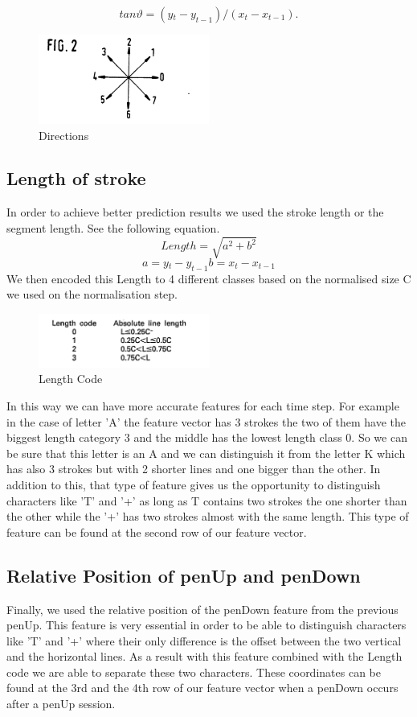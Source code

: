 \documentclass[a4paper, 10pt]{article}
\begin{document}
\[
tan \vartheta = (y{}_t - y_{t-1} )/(x{}_t - x_{t-1}) .
\]

\begin{figure}[h!]
  \caption{Directions}
  \centering
    \includegraphics[width=0.5\textwidth]{directions}
\end{figure}

\subsection{Length of stroke}
In order to achieve better prediction results we used the stroke length or the segment length. See the following equation.
\[
Length = \sqrt{a ^2 + b^2} 
\]
\[
a = y{}_t - y_{t-1}
b = x{}_t - x_{t-1}
\] 
We then encoded this Length to 4 different classes based on the normalised size C we used on the normalisation step.
\begin{figure}[h!]
  \caption{Length Code}
  \centering
    \includegraphics[width=0.5\textwidth]{lengthcode}
\end{figure}

In this way we can have more accurate features for each time step. For example in the case of letter 'A' the feature vector has 3 strokes the two of them have the biggest length category 3 and the middle has the lowest length class 0. So we can be sure that this letter is an A and we can distinguish it from the letter K which has also 3 strokes but with 2 shorter lines and one bigger than the other. In addition to this, that type of feature gives us the opportunity to distinguish characters like 'T' and '+' as long as T contains two strokes the one shorter than the other while the '+' has two strokes almost with the same length. This type of feature can be found at the second row of our feature vector.


\subsection{Relative Position of penUp and penDown}
Finally, we used the relative position of the penDown feature from the previous penUp. This feature is very essential in order to be able to distinguish characters like 'T' and '+' where their only difference is the offset between the two vertical and the horizontal lines. As a result with this feature combined with the Length code we are able to separate these two characters. These coordinates can be found at the 3rd and the 4th row of our feature vector when a penDown occurs after a penUp session.
\end{document}
